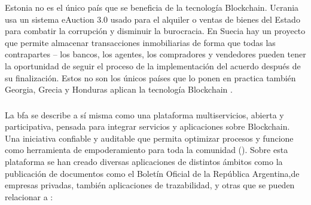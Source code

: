 Estonia no es el único país que se beneficia de la tecnología  Blockchain. Ucrania usa un sistema 
eAuction 3.0 usado para el alquiler o ventas de bienes del Estado para combatir 
la corrupción y disminuir la burocracia.
En Suecia hay un proyecto que permite almacenar transacciones inmobiliarias
de forma que todas las contrapartes – los bancos, los agentes, los compradores y vendedores  pueden 
tener la oportunidad de seguir el proceso de la implementación del acuerdo después de su finalización.
Estos no son los únicos países que lo ponen en practica también  Georgia, Grecia y Honduras aplican la tecnología
Blockchain \cite[]{brys_cadena_2019}.

\subsubsection{}
La \gls{bfa} se describe a sí misma como una plataforma multiservicios, abierta y participativa, pensada para integrar servicios y aplicaciones sobre Blockchain.
Una iniciativa confiable y auditable que permita optimizar procesos y funcione como herramienta de empoderamiento para toda la comunidad (\cite[]{Blockchain_federal_argentina_que_nodate}).
Sobre esta plataforma se han creado diversas aplicaciones de distintos ámbitos como la publicación de documentos como el {Boletín Oficial de la República Argentina},de empresas privadas, también aplicaciones de trazabilidad, y otras que se pueden relacionar a :

